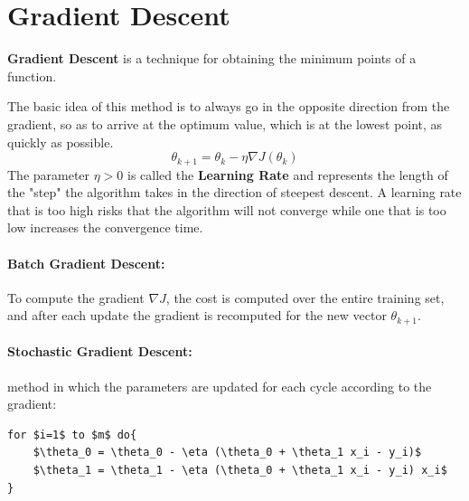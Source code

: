 \section{Gradient Descent}

\begin{mdframed}
    \textbf{Gradient Descent} is a technique for obtaining the minimum points of a function.
\end{mdframed}
 The basic idea of this method is to always go in the opposite direction from the gradient, so as to arrive at the optimum value, which is at the lowest point, as quickly as possible.
\begin{equation} \tag{Gradient Descent}
    \theta_{k+1} = \theta_k - \eta \nabla J(\theta_k)
\end{equation}
The parameter $\eta>0$ is called the \textbf{Learning Rate} and represents the length of the "step" the algorithm takes in the direction of steepest descent.
A learning rate that is too high risks that the algorithm will not converge while one that is too low increases the convergence time.
\paragraph{Batch Gradient Descent:} To compute the gradient $\nabla J$, the cost is computed over the entire training set, and after each update the gradient is recomputed for the new vector $\theta_{k+1}$.
\paragraph{Stochastic Gradient Descent:} method in which the parameters are updated for each cycle according to the gradient:
\begin{lstlisting}[mathescape=true]
for $i=1$ to $m$ do{
    $\theta_0 = \theta_0 - \eta (\theta_0 + \theta_1 x_i - y_i)$
    $\theta_1 = \theta_1 - \eta (\theta_0 + \theta_1 x_i - y_i) x_i$
}
\end{lstlisting}

